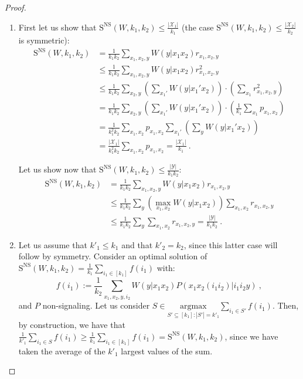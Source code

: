\begin{proof}
\begin{enumerate}
  \item First let us show that $\mathrm{S}^{\mathrm{NS}}(W,k_1,k_2) \leq \frac{|\mathcal{X}_1|}{k_1}$ (the case $\mathrm{S}^{\mathrm{NS}}(W,k_1,k_2) \leq \frac{|\mathcal{X}_2|}{k_2}$ is symmetric):
    \begin{equation}
      \begin{aligned}
        \mathrm{S}^{\mathrm{NS}}(W,k_1,k_2) &= \frac{1}{k_1k_2} \sum_{x_1,x_2,y} W(y|x_1x_2)r_{x_1,x_2,y}\\
        &\leq \frac{1}{k_1k_2} \sum_{x_1,x_2,y} W(y|x_1x_2)r^2_{x_1,x_2,y}\\
        &\leq \frac{1}{k_1k_2} \sum_{x_2,y} \left(\sum_{x_1'} W(y|x_1'x_2)\right)\cdot\left(\sum_{x_1} r^2_{x_1,x_2,y} \right)\\
        &=  \frac{1}{k_1k_2} \sum_{x_2,y} \left(\sum_{x_1'} W(y|x_1'x_2)\right)\cdot\left(\frac{1}{k_1} \sum_{x_1} p_{x_1,x_2} \right)\\
        &= \frac{1}{k_1^2k_2} \sum_{x_1,x_2} p_{x_1,x_2} \sum_{x_1'}\left(\sum_y W(y|x_1'x_2)\right)\\
        &= \frac{|\mathcal{X}_1|}{k_1^2k_2} \sum_{x_1,x_2} p_{x_1,x_2} = \frac{|\mathcal{X}_1|}{k_1} \ .
      \end{aligned}
    \end{equation}

    Let us show now that $\mathrm{S}^{\mathrm{NS}}(W,k_1,k_2) \leq \frac{|\mathcal{Y}|}{k_1k_2}$:
    \begin{equation}
      \begin{aligned}
        \mathrm{S}^{\mathrm{NS}}(W,k_1,k_2) &= \frac{1}{k_1k_2} \sum_{x_1,x_2,y} W(y|x_1x_2)r_{x_1,x_2,y}\\
        &\leq \frac{1}{k_1k_2} \sum_{y} \left(\max_{x_1,x_2} W(y|x_1x_2)\right) \sum_{x_1,x_2} r_{x_1,x_2,y}\\
        &\leq \frac{1}{k_1k_2} \sum_{y} \sum_{x_1,x_2} r_{x_1,x_2,y} = \frac{|\mathcal{Y}|}{k_1k_2} \ .
      \end{aligned}
    \end{equation}
  \item Let us assume that $k'_1 \leq k_1$ and that $k'_2 = k_2$, since this latter case will follow by symmetry. Consider an optimal solution of $\mathrm{S}^{\mathrm{NS}}(W,k_1,k_2) = \frac{1}{k_1} \sum_{i_1 \in [k_1]} f(i_1)$ with:
    \[ f(i_1) := \frac{1}{k_2} \sum_{x_1,x_2,y,i_2} W(y|x_1x_2)P(x_1x_2(i_1i_2)|i_1i_2y) \ ,\]
    and $P$ non-signaling. Let us consider $S \in \underset{S' \subseteq [k_1]: |S'|=k'_1}{\text{argmax}} \sum_{i_1 \in S'} f(i_1)$. Then, by construction, we have that $\frac{1}{k'_1}\sum_{i_1 \in S} f(i_1) \geq \frac{1}{k_1} \sum_{i_1 \in [k_1]} f(i_1) = \mathrm{S}^{\mathrm{NS}}(W,k_1,k_2)$, since we have taken the average of the $k'_1$ largest values of the sum.


\end{enumerate}
\end{proof}
